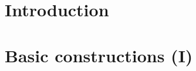 

\usepackage[english]{cleveref}

\def\VARdatum{\today}
\def\VARname{Stefano Rosarin}


	
	
	
	
	\setcounter{tocdepth}{2}
	\tableofcontents
	\clearpage
	
	\setcounter{section}{-1}
	\section{Introduction}
	
	
	\clearpage
	\section{Basic constructions (I)}
	
	
	
	\appendix
	
	\clearpage
	
	\printbibliography[heading=bibintoc]
	
